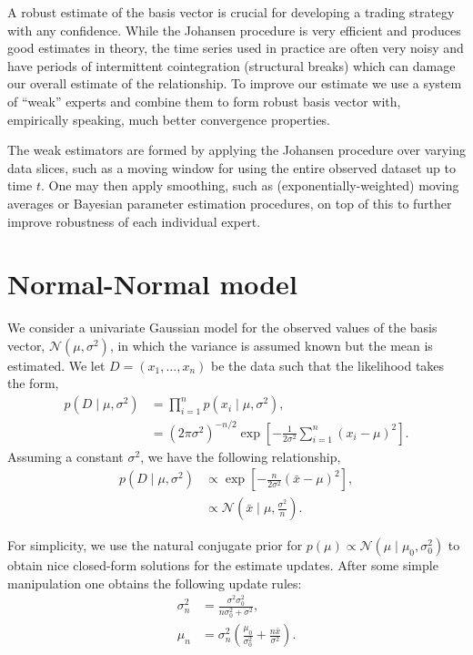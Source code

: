 A robust estimate of the basis vector is crucial for developing a trading
strategy with any confidence. While the Johansen procedure is very efficient
and produces good estimates in theory, the time series used in practice are
often very noisy and have periods of intermittent cointegration (structural
breaks) which can damage our overall estimate of the relationship. To improve
our estimate we use a system of ``weak'' experts and combine them to form
robust basis vector with, empirically speaking, much better convergence
properties.

The weak estimators are formed by applying the Johansen procedure over varying
data slices, such as a moving window for using the entire observed dataset up
to time $t$. One may then apply smoothing, such as (exponentially-weighted)
moving averages or Bayesian parameter estimation procedures, on top of this to
further improve robustness of each individual expert.

\section{Normal-Normal model}
We consider a univariate Gaussian model for the observed values of the basis
vector, $\mathcal{N}(\mu, \sigma^2)$, in which the variance is assumed known
but the mean is estimated. We let $D = (x_1, \ldots, x_n)$ be the data such
that the likelihood takes the form,
\begin{align}
    p(D \mid \mu, \sigma^2) &= \prod_{i=1}^n p(x_i \mid \mu, \sigma^2), \\
    &= (2\pi\sigma^2)^{-n/2}
           \exp\left[-\frac{1}{2\sigma^2} \sum_{i=1}^n (x_i - \mu)^2\right].
\end{align}
Assuming a constant $\sigma^2$, we have the following relationship,
\begin{align}
    p(D \mid \mu, \sigma^2) &\propto
        \exp\left[-\frac{n}{2\sigma^2}(\bar x - \mu)^2\right], \\
    &\propto \mathcal{N}(\bar x \mid \mu, \frac{\sigma^2}{n}).
\end{align}

For simplicity, we use the natural conjugate prior for $p(\mu) \propto
\mathcal{N}(\mu \mid \mu_0, \sigma_0^2)$ to obtain nice closed-form solutions
for the estimate updates. After some simple manipulation one obtains the following update rules:
\begin{align}
    \sigma_n^2 &= \frac{\sigma^2\sigma_0^2}{n\sigma_0^2 + \sigma^2}, \\
    \mu_n &= \sigma_n^2\left(\frac{\mu_0}{\sigma_0^2} + \frac{n\bar
        x}{\sigma^2}\right).
\end{align}

